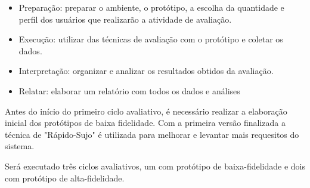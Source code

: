 \begin{itemize}
	\item Preparação: preparar o ambiente, o protótipo, a escolha da quantidade e perfil dos usuários que realizarão a atividade de avaliação.
	\item Execução: utilizar das técnicas de avaliação com o protótipo e coletar os dados.
	\item Interpretação: organizar e analizar os resultados obtidos da avaliação.
	\item Relatar: elaborar um relatório com todos os dados e análises
\end{itemize}

Antes do início do primeiro ciclo avaliativo, é necessário realizar a elaboração inicial dos protótipos de baixa fidelidade. Com a primeira versão finalizada a técnica de "Rápido-Sujo" é utilizada para melhorar e levantar mais requesitos do sistema.

Será executado três ciclos avaliativos, um com protótipo de baixa-fidelidade e dois com protótipo de alta-fidelidade.